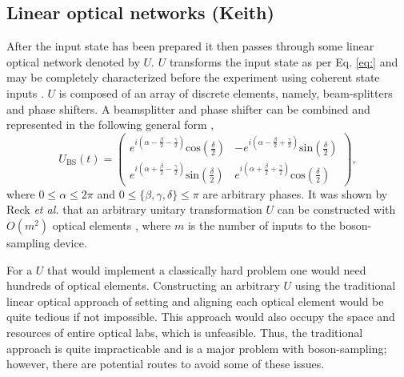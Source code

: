 \documentclass[aps,pra,twocolumn,amsmath,amssymb,nofootinbib,superscriptaddress]{revtex4}
\begin{document}
\subsection{Linear optical networks (Keith)}
After the input state has been prepared it then passes through some linear optical network denoted by $U$. $U$ transforms the input state as per Eq. \ref{eq:} and may be completely characterized before the experiment using coherent state inputs \cite{bib:PhysRevLett.73.58}. $U$ is composed of an array of discrete elements, namely, beam-splitters and phase shifters.  A beamsplitter and phase shifter can be combined and represented in the following general form \cite{bib:GerryKnight05},
\begin{equation} \label{eq:BS}
U_{\mathrm{BS}}(t) = \left( \begin{array}{cc}
e^{i(\alpha-\frac{\beta}{2}-\frac{\gamma}{2})}\mathrm{cos}\left(\frac{\delta}{2}\right) & -e^{i(\alpha-\frac{\beta}{2}+\frac{\gamma}{2})}\mathrm{sin}\left(\frac{\delta}{2}\right)  \\
e^{i(\alpha+\frac{\beta}{2}-\frac{\gamma}{2})}\mathrm{sin}\left(\frac{\delta}{2}\right) & e^{i(\alpha+\frac{\beta}{2}+\frac{\gamma}{2})}\mathrm{cos}\left(\frac{\delta}{2}\right)
\end{array} \right), 
\end{equation}
where $0\leq\alpha\leq2\pi$ and $0\leq\{\beta,\gamma,\delta\}\leq\pi$ are arbitrary phases. It was shown by Reck \emph{et al.} that an arbitrary unitary transformation $U$ can be constructed with  $O(m^2)$ optical elements \cite{bib:PhysRevLett.73.58}, where $m$ is the number of inputs to the boson-sampling device. 

For a $U$ that would implement a classically hard problem one would need hundreds of optical elements. Constructing an arbitrary $U$ using the traditional linear optical approach of setting and aligning each optical element would be quite tedious if not impossible. This approach would also occupy the space and resources of entire optical labs, which is unfeasible. Thus, the traditional approach is quite impracticable and is a major problem with boson-sampling; however, there are potential routes to avoid some of these issues.  
\end{document}
